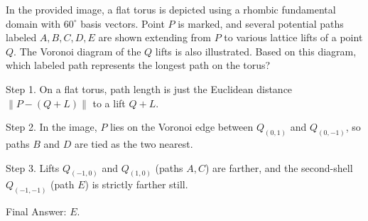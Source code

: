 In the provided image, a flat torus is depicted using a rhombic fundamental domain with $60^\circ$ basis vectors. Point $P$ is marked, and several potential paths labeled $A, B, C, D, E$ are shown extending from $P$ to various lattice lifts of a point $Q$. The Voronoi diagram of the $Q$ lifts is also illustrated. Based on this diagram, which labeled path represents the longest path on the torus?

Step 1. On a flat torus, path length is just the Euclidean distance $ \|P-(Q+L)\| $ to a lift $Q+L$.

Step 2. In the image, $P$ lies on the Voronoi edge between $Q_{(0,1)}$ and $Q_{(0,-1)}$, so paths $B$ and $D$ are tied as the two nearest.

Step 3. Lifts $Q_{(-1,0)}$ and $Q_{(1,0)}$ (paths $A,C$) are farther, and the second-shell $Q_{(-1,-1)}$ (path $E$) is strictly farther still.

Final Answer: $E$.